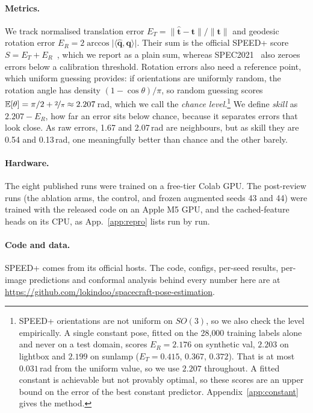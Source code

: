 \documentclass{article}
\newcommand{\Erot}{E_{R}}
\newcommand{\Etrans}{E_{T}}
\begin{document}
\paragraph{Metrics.} We track normalised translation error $\Etrans =
\lVert\hat{\mathbf{t}}-\mathbf{t}\rVert / \lVert\mathbf{t}\rVert$ and geodesic rotation error
$\Erot = 2\arccos\lvert\langle\hat{\mathbf{q}}, \mathbf{q}\rangle\rvert$. Their sum is the
official SPEED+ score $S = \Etrans + \Erot$~\citep{kisantal2020speed}, which we report as a
plain sum, whereas SPEC2021~\citep{park2023spec2021} also zeroes errors below a calibration
threshold. Rotation errors also need a reference point, which uniform guessing provides: if
orientations are uniformly random, the rotation angle has density $(1-\cos\theta)/\pi$, so
random guessing scores
$\mathbb{E}[\theta] = \pi/2 + \nicefrac{2}{\pi} \approx 2.207$\,rad, which we call the
\emph{chance level}.\footnote{SPEED+
orientations are not uniform on $SO(3)$, so we also check the level empirically. A single
constant pose, fitted on the 28{,}000 training labels alone and never on a test domain, scores
$\Erot = 2.176$ on synthetic val, $2.203$ on lightbox and $2.199$ on sunlamp ($\Etrans =
0.415$, $0.367$, $0.372$). That is at most $0.031$\,rad from the uniform value, so we use
$2.207$ throughout. A fitted constant is achievable but not provably optimal, so these scores
are an upper bound on the error of the best constant predictor. Appendix~\ref{app:constant}
gives the method.} We define \emph{skill} as $2.207 - \Erot$, how far an error sits below chance,
because it separates errors that look close. As raw errors, 1.67 and 2.07\,rad are neighbours,
but as skill they are 0.54 and 0.13\,rad, one meaningfully better than chance and the other
barely.

\paragraph{Hardware.} The eight published runs were trained on a free-tier Colab GPU. The
post-review runs (the ablation arms, the control, and frozen augmented seeds 43 and 44) were
trained with the released code on an Apple M5 GPU, and the cached-feature heads on its CPU, as
App.~\ref{app:repro} lists run by run.

\paragraph{Code and data.} SPEED+ comes from its official hosts. The code, configs, per-seed
results, per-image predictions and conformal analysis behind every number here are at
\url{https://github.com/lokindoo/spacecraft-pose-estimation}.
\end{document}

